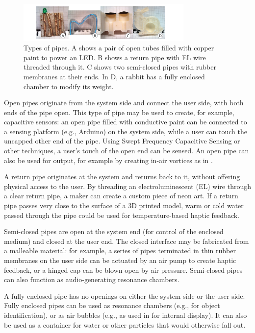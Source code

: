 \begin{figure}[h!]
\centering
    \includegraphics[width=3.4in]{figures/types.png}
\caption{Types of pipes.  A shows a pair of open tubes filled with copper paint to power an LED.  B shows a return pipe with EL wire threaded through it.  C shows two semi-closed pipes with rubber membranes at their ends.  In D, a rabbit has a fully enclosed chamber to modify its weight.}
\label{fig:pipespace}
\end{figure}

Open pipes originate from the system side and connect the user side, with both ends of the pipe open. This type of pipe may be used to create, for example, capacitive sensors: an open pipe filled with conductive paint can be connected to a sensing platform (e.g., Arduino) on the system side, while a user can touch the uncapped other end of the pipe.  Using Swept Frequency Capacitive Sensing \cite{Sato-touche} or other techniques, a user's touch of the open end can be sensed.  An open pipe can also be used for output, for example by creating in-air vortices as in \cite{Sodhi-aireal}.

A return pipe originates at the system and returns back to it, without offering physical access to the user.  By threading an electroluminescent (EL) wire through a clear return pipe, a maker can create a custom piece of neon art.  If a return pipe passes very close to the surface of a 3D printed model, warm or cold water passed through the pipe could be used for temperature-based haptic feedback.

Semi-closed pipes are open at the system end (for control of the enclosed medium) and closed at the user end.  The closed interface  may be fabricated from a malleable material: for example, a series of pipes terminated in thin rubber membranes on the user side can be actuated by an air pump to create haptic feedback, or a hinged cap can be blown open by air pressure.  Semi-closed pipes can also function as audio-generating resonance chambers.

A fully enclosed pipe has no openings on either the system side or the user side.  Fully enclosed pipes can be used as resonance chambers (e.g., for object identification), or as air bubbles (e.g., as used in \cite{Willis-printedoptics} for internal display).  It can also be used as a container for water or other particles that would otherwise fall out.

